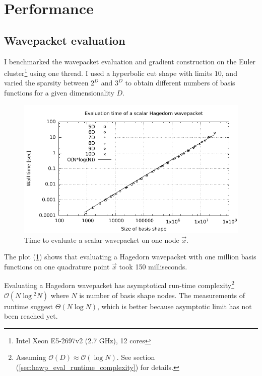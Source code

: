 \documentclass{article}
\begin{document}
\section{Performance}

\subsection{Wavepacket evaluation}

I benchmarked the wavepacket evaluation and gradient construction
on the
Euler cluster\footnote{Intel Xeon E5-2697v2 (2.7 GHz), 12 cores}
using one thread.
I used a hyperbolic cut shape with limits \(10\), and varied the
sparsity between \(2^D\) and \(3^D\) to obtain different numbers of
basis functions for a given dimensionality \(D\).

\begin{figure}[H]
  \centering
  \includegraphics[width=1.0\textwidth]{plots/hawp_eval_runtime}
  \caption{Time to evaluate a scalar wavepacket on one node \(\vec{x}\).}
  \label{fig:hawp_eval_runtime}
\end{figure}

The plot (\ref{fig:hawp_eval_runtime}) shows that
evaluating a Hagedorn wavepacket with one million basis functions
on one quadrature point \(\vec{x}\) took 150 milliseconds.

Evaluating a Hagedorn wavepacket has asymptotical run-time
complexity\footnote{Assuming \(\mathcal{O}(D) \approx \mathcal{O}(\log{}N)\).
See section (\ref{sec:hawp_eval_runtime_complexity}) for details.}
\(\mathcal{O}(N \log{}^2N)\)
where \(N\) is number of basis shape nodes. The measurements of runtime suggest \(\Theta(N\log{}N)\),
which is better because asymptotic limit has not been reached yet.
\end{document}
